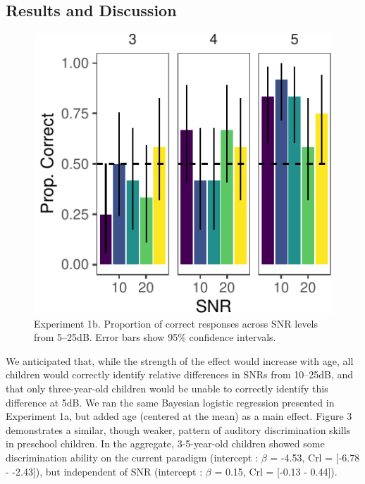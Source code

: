 \documentclass[10pt, letterpaper]{article}
\newenvironment{CodeChunk}{}{}
\begin{document}
\hypertarget{results-and-discussion-1}{%
\subsection{Results and Discussion}\label{results-and-discussion-1}}

\begin{CodeChunk}
\begin{figure}[t]

{\centering \includegraphics{figs/e1b-bar-1} 

}

\caption[Experiment 1b]{Experiment 1b. Proportion of correct responses across SNR levels from 5--25dB. Error bars show 95\% confidence intervals.}\label{fig:e1b-bar}
\end{figure}
\end{CodeChunk}

We anticipated that, while the strength of the effect would increase
with age, all children would correctly identify relative differences in
SNRs from 10--25dB, and that only three-year-old children would be
unable to correctly identify this difference at 5dB. We ran the same
Bayesian logistic regression presented in Experiment 1a, but added age
(centered at the mean) as a main effect. Figure 3 demonstrates a
similar, though weaker, pattern of auditory discrimination skills in
preschool children. In the aggregate, 3-5-year-old children showed some
discrimination ability on the current paradigm (intercept : \(\beta\) =
-4.53, Crl = {[}-6.78 - -2.43{]}), but independent of SNR (intercept :
\(\beta\) = 0.15, Crl = {[}-0.13 - 0.44{]}).
\end{document}
